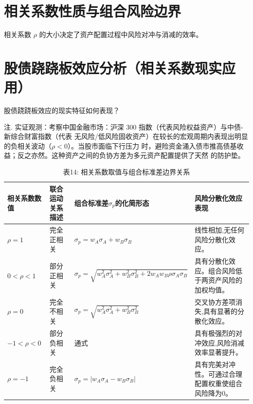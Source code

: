 \documentclass[lang=cn,10pt,color=blue]{elegantbook}
\begin{document}
\section{相关系数性质与组合风险边界}

相关系数 $\rho$ 的大小决定了资产配置过程中风险对冲与消减的效率。 

\section{股债跷跷板效应分析（相关系数现实应用）}

股债跷跷板效应的现实特征如何表现？ 

注. 实证观测：考察中国金融市场：沪深 300 指数（代表风险权益资产）与中债-新综合财富指数（代表 无风险/低风险固收资产）在较长的宏观周期内表现出明显的负相关波动（$\rho < 0$）。当股市面临下行压力 时，避险资金涌入债市推高债基收益；反之亦然。这种资产之间的负协方差为多元资产配置提供了天然 的防护垫。

\begin{table}[ht]
  \centering
  \caption{表14: 相关系数取值与组合标准差边界关系}
  \renewcommand{\arraystretch}{1.4}
\begin{tabularx}{\textwidth}{llYY}
  \toprule
  相关系数数值 & 联合运动关系描述 & 组合标准差$\sigma_p$的化简形态 & 风险分散化效应表现 \\
  \midrule
  $\rho=1$ & 完全正相关 & $\sigma_p=w_A\sigma_A+w_B\sigma_B$ & 线性相加,无任何风险分散化效应。 \\
  $0<\rho<1$ & 部分正相关 & $\sigma_p=\sqrt{w_A^2\sigma_A^2+w_B^2\sigma_B^2+2w_A w_B\rho\sigma_A\sigma_B}$ & 具有分散化效应。组合风险低于两资产风险的加权均值。 \\
  $\rho=0$ & 完全不相关 & $\sigma_p=\sqrt{w_A^2\sigma_A^2+w_B^2\sigma_B^2}$ & 交叉协方差项消失,具有显著的分散化效应。 \\
  $-1<\rho<0$ & 部分负相关 & 通式 & 具有极强烈的对冲效应,风险消减效率显著提升。 \\
  $\rho=-1$ & 完全负相关 & $\sigma_p=|w_A\sigma_A-w_B\sigma_B|$ & 具有完美对冲性。可通过合理配置权重使组合风险降为0。 \\
  \bottomrule
\end{tabularx}
\end{table}
\end{document}
